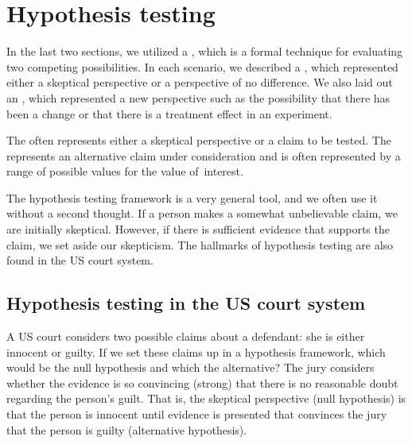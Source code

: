 \section{Hypothesis testing}
\label{HypothesisTesting}

In the last two sections, we utilized a , which is a formal technique for evaluating two competing possibilities. In each scenario, we described a , which represented either a skeptical perspective or a perspective of no difference. We also laid out an , which represented a new perspective such as the possibility that there has been a change or that there is a treatment effect in an experiment.

\begin{termBox}{
The  often represents either a skeptical perspective or a claim to be tested. The  represents an alternative claim under consideration and is often represented by a range of possible values for the value of~interest.}
\end{termBox}

The hypothesis testing framework is a very general tool, and we often use it without a second thought. If a person makes a somewhat unbelievable claim, we are initially skeptical. However, if there is sufficient evidence that supports the claim, we set aside our skepticism. The hallmarks of hypothesis testing are also found in the US court system. 

\subsection{Hypothesis testing in the US court system}

\begin{example}{A US court considers two possible claims about a defendant: she is either innocent or guilty. If we set these claims up in a hypothesis framework, which would be the null hypothesis and which the alternative?}\label{hypTestCourtExample}
The jury considers whether the evidence is so convincing (strong) that there is no reasonable doubt regarding the person's guilt. That is, the skeptical perspective (null hypothesis) is that the person is innocent until evidence is presented that convinces the jury that the person is guilty (alternative hypothesis).
\end{example}

